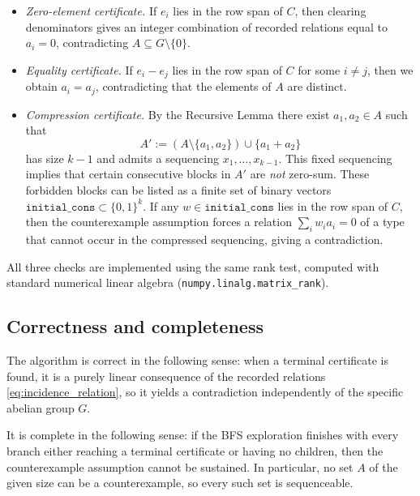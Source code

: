 \documentclass[11pt]{amsart}
\theoremstyle{definition}
\begin{document}
\begin{itemize}
	\item \emph{Zero-element certificate.}
	If $e_i$ lies in the row span of $C$, then clearing denominators gives an
	integer combination of recorded relations equal to $a_i=0$, contradicting
	$A\subseteq G\setminus\{0\}$.
	
	\item \emph{Equality certificate.}
	If $e_i-e_j$ lies in the row span of $C$ for some $i\ne j$, then we obtain
	$a_i=a_j$, contradicting that the elements of $A$ are distinct.
	
	\item \emph{Compression certificate.}
	By the Recursive Lemma there exist $a_1,a_2\in A$ such that
	\[
	A':=(A\setminus\{a_1,a_2\})\cup\{a_1+a_2\}
	\]
	has size $k-1$ and admits a sequencing $x_1,\dots,x_{k-1}$.
	This fixed sequencing implies that certain consecutive blocks in $A'$ are
	\emph{not} zero-sum.  These forbidden blocks can be listed as a finite set of
	binary vectors $\mathtt{initial\_cons}\subset\{0,1\}^k$.
	If any $w\in\mathtt{initial\_cons}$ lies in the row span of $C$, then
	the counterexample assumption forces a relation $\sum_i w_i a_i=0$ of a type
	that cannot occur in the compressed sequencing, giving a contradiction.
\end{itemize}

All three checks are implemented using the same rank test, computed with
standard numerical linear algebra (\texttt{numpy.linalg.matrix\_rank}).

\subsection*{Correctness and completeness}

The algorithm is correct in the following sense: when a terminal certificate is
found, it is a purely linear consequence of the recorded relations
\eqref{eq:incidence_relation}, so it yields a contradiction independently of
the specific abelian group $G$.

It is complete in the following sense: if the BFS exploration finishes with
every branch either reaching a terminal certificate or having no children, then
the counterexample assumption cannot be sustained.  In particular, no set $A$
of the given size can be a counterexample, so every such set is sequenceable.
\end{document}
